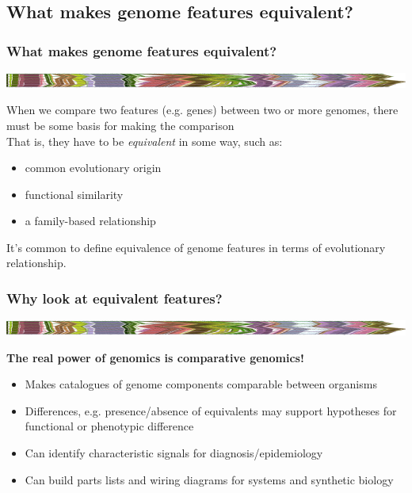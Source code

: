 
\subsection{What makes genome features equivalent?}

\begin{frame}
  \frametitle{What makes genome features equivalent?}
  \begin{center}
    \includegraphics[width=1\textwidth]{images/collinear_zeae}  
  \end{center}
  When we compare two features (e.g. genes) between two or more genomes, there must be some basis for making the comparison \\
  That is, they have to be \textit{equivalent} in some way, such as:
  \begin{itemize}
    \item common evolutionary origin
    \item functional similarity
    \item a family-based relationship
  \end{itemize}
  It's common to define equivalence of genome features in terms of evolutionary relationship.
\end{frame}

\begin{frame}
  \frametitle{Why look at equivalent features?}
  \begin{center}
    \includegraphics[width=1\textwidth]{images/collinear_zeae}  
  \end{center}
  \textbf{The real power of genomics is comparative genomics!}
  \begin{itemize}
    \item Makes catalogues of genome components comparable between organisms
    \item Differences, e.g. presence/absence of equivalents may support hypotheses for functional or phenotypic difference
    \item Can identify characteristic signals for diagnosis/epidemiology
    \item Can build parts lists and wiring diagrams for systems and synthetic biology
  \end{itemize}
\end{frame}

